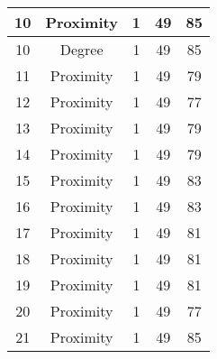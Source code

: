 \documentclass[results.tex]{subfiles}
\begin{document}
\begin{center}
\begin{tabular}{| c || c | c | c | c |}
            \hline
            10                      & Proximity                    & 1                      & 49                      & 85                   \\
            \hline
            10                      & Degree                       & 1                      & 49                      & 85                   \\
            \hline
            11                      & Proximity                    & 1                      & 49                      & 79                   \\
            \hline
            12                      & Proximity                    & 1                      & 49                      & 77                   \\
            \hline
            13                      & Proximity                    & 1                      & 49                      & 79                   \\
            \hline
            14                      & Proximity                    & 1                      & 49                      & 79                   \\
            \hline
            15                      & Proximity                    & 1                      & 49                      & 83                   \\
            \hline
            16                      & Proximity                    & 1                      & 49                      & 83                   \\
            \hline
            17                      & Proximity                    & 1                      & 49                      & 81                   \\
            \hline
            18                      & Proximity                    & 1                      & 49                      & 81                   \\
            \hline
            19                      & Proximity                    & 1                      & 49                      & 81                   \\
            \hline
            20                      & Proximity                    & 1                      & 49                      & 77                   \\
            \hline
            21                      & Proximity                    & 1                      & 49                      & 85                   \\

\end{tabular}
\end{center}
\end{document}
